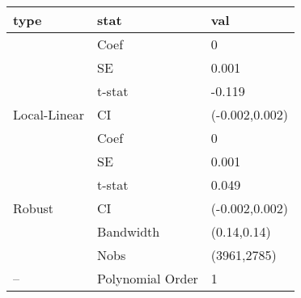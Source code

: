 
\begin{tabular}{lll}
\toprule
type & stat & val\\
\midrule
 & Coef & 0\\

 & SE & 0.001\\

 & t-stat & -0.119\\

\multirow{-4}{*}{\raggedright\arraybackslash Local-Linear} & CI & (-0.002,0.002)\\
\cmidrule{1-3}
 & Coef & 0\\

 & SE & 0.001\\

 & t-stat & 0.049\\

\multirow{-4}{*}{\raggedright\arraybackslash Robust} & CI & (-0.002,0.002)\\
\cmidrule{1-3}
 & Bandwidth & (0.14,0.14)\\

 & Nobs & (3961,2785)\\

\multirow{-3}{*}{\raggedright\arraybackslash --} & Polynomial Order & 1\\
\bottomrule
\end{tabular}
